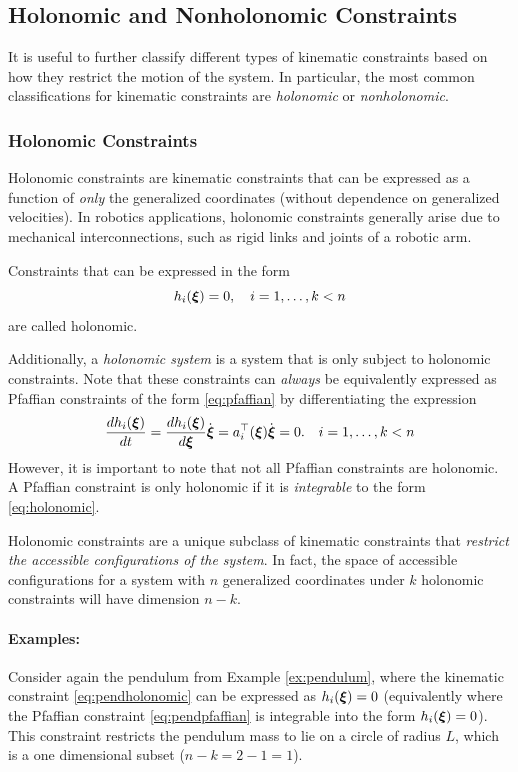 \subsection{Holonomic and Nonholonomic Constraints}
It is useful to further classify different types of kinematic constraints based on how they restrict the motion of the system. In particular, the most common classifications for kinematic constraints are \textit{holonomic} or \textit{nonholonomic}.

\subsubsection{Holonomic Constraints}
Holonomic constraints are kinematic constraints that can be expressed as a function of \textit{only} the generalized coordinates (without dependence on generalized velocities).
In robotics applications, holonomic constraints generally arise due to mechanical interconnections, such as rigid links and joints of a robotic arm.

\begin{definition} 
Constraints that can be expressed in the form 
\begin{equation}
    h_i(\bm{\xi}) = 0, \quad i = 1, \dots, k < n
    \label{eq:holonomic}
\end{equation}
are called holonomic.
\end{definition}
Additionally, a \textit{holonomic system} is a system that is only subject to holonomic constraints.
Note that these constraints can \textit{always} be equivalently expressed as Pfaffian constraints of the form \eqref{eq:pfaffian} by differentiating the expression
\begin{equation}
\frac{dh_i(\bm{\xi})}{dt} = \frac{dh_i(\bm{\xi})}{d\bm{\xi}}\dot{\bm{\xi}} = a_i^\top (\bm{\xi}) \dot{\bm{\xi}} = 0. \quad i = 1, \dots, k < n
\end{equation}
However, it is important to note that not all Pfaffian constraints are holonomic. A Pfaffian constraint is only holonomic if it is \textit{integrable} to the form \eqref{eq:holonomic}.

Holonomic constraints are a unique subclass of kinematic constraints that \textit{restrict the accessible configurations of the system}. In fact, the space of accessible configurations for a system with $n$ generalized coordinates under $k$ holonomic constraints will have dimension $n-k$.

\paragraph{Examples:}
Consider again the pendulum from Example \ref{ex:pendulum}, where the kinematic constraint \eqref{eq:pendholonomic} can be expressed as $h_i(\bm{\xi}) = 0$ (equivalently where the Pfaffian constraint \eqref{eq:pendpfaffian} is integrable into the form $h_i(\bm{\xi}) = 0$). This constraint restricts the pendulum mass to lie on a circle of radius $L$, which is a one dimensional subset ($n-k = 2-1 = 1$). 

